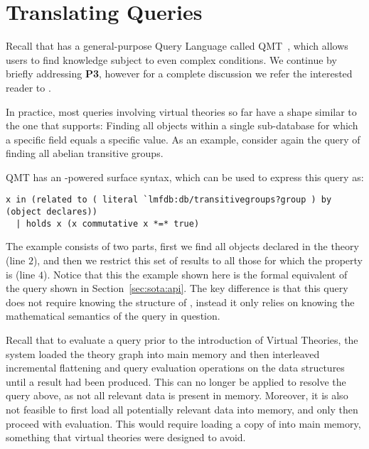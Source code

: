 \section{Translating Queries}\label{sec:qmt}

Recall that \mmt has a general-purpose Query Language called QMT~\cite{Rabe:qlfml12}, which allows users to find knowledge subject to even complex conditions. 
We continue by briefly addressing \textbf{P3}, however for a complete discussion we refer the interested reader to \cite{twiesing:msc17}. 

In practice, most queries involving virtual theories so far have a shape similar to the one that \lmfdb supports: 
Finding all objects within a single sub-database for which a specific field equals a specific value. 
As an example, consider again the query of finding all abelian transitive groups. 
 
QMT has an \mmt-powered surface syntax, which can be used to express this query as:
\begin{lstlisting}[language=qmt,basicstyle=\small\sf]
x in (related to ( literal `lmfdb:db/transitivegroups?group ) by (object declares)) 
  | holds x (x commutative x *=* true)
\end{lstlisting}

The example consists of two parts, first we find all objects declared in the  theory (line $2$), and then we restrict this set of results to all those for which the  property is  (line $4$). 
Notice that this the example shown here is the formal equivalent of the \lmfdb query shown in Section~\ref{sec:sota:api}. 
The key difference is that this query does not require knowing the structure of \lmfdb, instead it only relies on knowing the mathematical semantics of the query in question. 

Recall that to evaluate a query prior to the introduction of Virtual Theories, the \mmt system loaded the theory graph into main memory and then interleaved incremental flattening and query evaluation operations on the \mmt data structures until a result had been produced. 
This can no longer be applied to resolve the query above, as not all relevant data is present in memory. 
Moreover, it is also not feasible to first load all potentially relevant data into memory, and only then proceed with evaluation. 
This would require loading a copy of \lmfdb into main memory, something that virtual theories were designed to avoid. 

